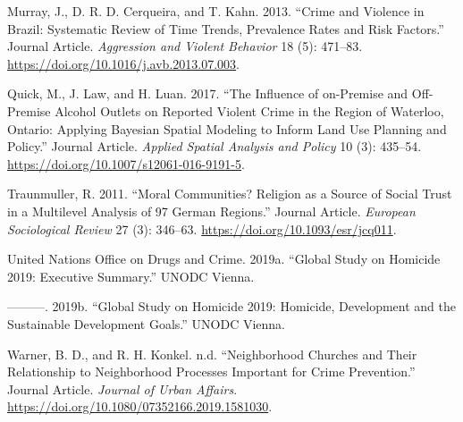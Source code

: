\documentclass[smallextended]{svjour3}       %
\begin{document}
\leavevmode\hypertarget{ref-Murray2013crime}{}%
Murray, J., D. R. D. Cerqueira, and T. Kahn. 2013. ``Crime and Violence
in Brazil: Systematic Review of Time Trends, Prevalence Rates and Risk
Factors.'' Journal Article. \emph{Aggression and Violent Behavior} 18
(5): 471--83. \url{https://doi.org/10.1016/j.avb.2013.07.003}.

\leavevmode\hypertarget{ref-Quick2017influence}{}%
Quick, M., J. Law, and H. Luan. 2017. ``The Influence of on-Premise and
Off-Premise Alcohol Outlets on Reported Violent Crime in the Region of
Waterloo, Ontario: Applying Bayesian Spatial Modeling to Inform Land Use
Planning and Policy.'' Journal Article. \emph{Applied Spatial Analysis
and Policy} 10 (3): 435--54.
\url{https://doi.org/10.1007/s12061-016-9191-5}.

\leavevmode\hypertarget{ref-Traunmuller2011moral}{}%
Traunmuller, R. 2011. ``Moral Communities? Religion as a Source of
Social Trust in a Multilevel Analysis of 97 German Regions.'' Journal
Article. \emph{European Sociological Review} 27 (3): 346--63.
\url{https://doi.org/10.1093/esr/jcq011}.

\leavevmode\hypertarget{ref-Unodc2019executive}{}%
United Nations Office on Drugs and Crime. 2019a. ``Global Study on
Homicide 2019: Executive Summary.'' UNODC Vienna.

\leavevmode\hypertarget{ref-Unodc2019development}{}%
---------. 2019b. ``Global Study on Homicide 2019: Homicide, Development
and the Sustainable Development Goals.'' UNODC Vienna.

\leavevmode\hypertarget{ref-Warner2019neighborhood}{}%
Warner, B. D., and R. H. Konkel. n.d. ``Neighborhood Churches and Their
Relationship to Neighborhood Processes Important for Crime Prevention.''
Journal Article. \emph{Journal of Urban Affairs}.
\url{https://doi.org/10.1080/07352166.2019.1581030}.



\end{document}
